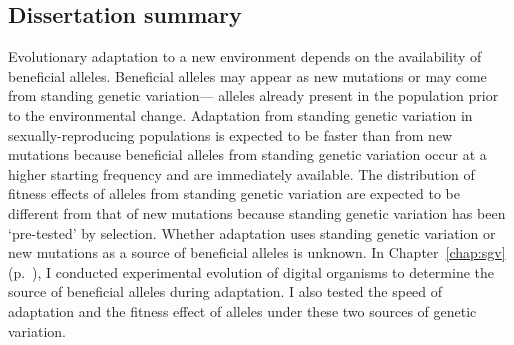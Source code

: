 \begin{doublespace}
\section*{Dissertation summary}

Evolutionary adaptation to a new environment
depends on the availability of beneficial alleles.
%
Beneficial alleles may appear as new mutations
or may come from standing genetic variation---%
alleles already present in the population
prior to the environmental change.
%
Adaptation from standing genetic variation
in sexually-reproducing populations
is expected to be faster than from new mutations
because beneficial alleles from standing genetic variation
occur at a higher starting frequency and are immediately available.
%
The distribution of fitness effects of alleles
from standing genetic variation are expected to be different
from that of new mutations because standing genetic variation
has been `pre-tested' by selection.
%
Whether adaptation uses standing genetic variation
or new mutations as a source of beneficial alleles is unknown.
%
In Chapter~\ref{chap:sgv} (p.~\pageref{chap:sgv}),
I conducted experimental evolution of digital organisms
to determine the source of beneficial alleles during adaptation.
%
I also tested the speed of adaptation
and the fitness effect of alleles
under these two sources of genetic variation.




\end{doublespace}
